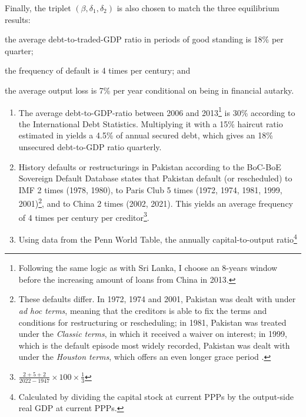 Finally, the triplet $\left( \beta, \delta_1, \delta_2 \right)$ is also chosen to match the three equilibrium results:
\begin{enumerate*}[label = (\roman*)]
    \item the average debt-to-traded-GDP ratio in periods of good standing is 18\% per quarter;
    \item the frequency of default is 4 times per century; and
    \item the average output loss is 7\% per year conditional on being in financial autarky.
\end{enumerate*}
\begin{enumerate}[label = (\roman*)]
    \item
The average debt-to-GDP-ratio between 2006 and 2013\footnote{
    Following the same logic as with Sri Lanka, I choose an 8-years window before the increasing amount of loans from China in 2013.}
is 30\% according to the International Debt Statistics. Multiplying it with a 15\% haircut ratio estimated in \citet{Cruces-Trebesch-13} yields a 4.5\% of annual secured debt, which gives an 18\% unsecured debt-to-GDP ratio quarterly.
    \item History defaults or restructurings in Pakistan according to the BoC-BoE Sovereign Default Database states that Pakistan default (or rescheduled) to IMF 2 times (1978, 1980), to Paris Club 5 times (1972, 1974, 1981, 1999, 2001)\footnote{
        These defaults differ. In 1972, 1974 and 2001, Pakistan was dealt with under \emph{ad hoc terms}, meaning that the creditors is able to fix the terms and conditions for restructuring or rescheduling; in 1981, Pakistan was treated under the \emph{Classic terms}, in which it received a waiver on interest; in 1999, which is the default episode most widely recorded, Pakistan was dealt with under the \emph{Houston terms}, which offers an even longer grace period \citep{pakistan-default-start}.
    }, and to China 2 times (2002, 2021). This yields an average frequency of 4 times per century per creditor\footnote{$\frac{2+5+2}{2022 - 1947}\times 100 \times \frac{1}{3}$}.
    \item Using data from the Penn World Table, the annually capital-to-output ratio\footnote{
        Calculated by dividing the capital stock at current PPPs by the output-side real GDP at current PPPs.}

\end{enumerate}
